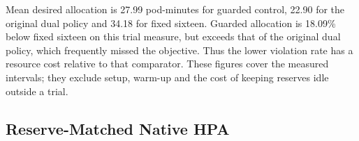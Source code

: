 \documentclass[10pt,twocolumn,a4paper]{article}
\begin{document}
\begin{table}[t]\centering\small\setlength{\tabcolsep}{3pt}
\caption{Paired comparisons by workload and seed. Negative values indicate fewer violations or fewer desired pod-minutes for guarded control. All policies share a ceiling of sixteen replicas.}\label{tab:paired}
\ifdim\wd\databox>\textwidth\relax\resizebox{\textwidth}{!}{\usebox{\databox}}\else\usebox{\databox}\fi
\end{table}

Mean desired allocation is 27.99 pod-minutes for guarded control, 22.90 for the original dual policy and 34.18 for fixed sixteen. Guarded allocation is 18.09\% below fixed sixteen on this trial measure, but exceeds that of the original dual policy, which frequently missed the objective. Thus the lower violation rate has a resource cost relative to that comparator. These figures cover the measured intervals; they exclude setup, warm-up and the cost of keeping reserves idle outside a trial.

\subsection{Reserve-Matched Native HPA}
\end{document}

